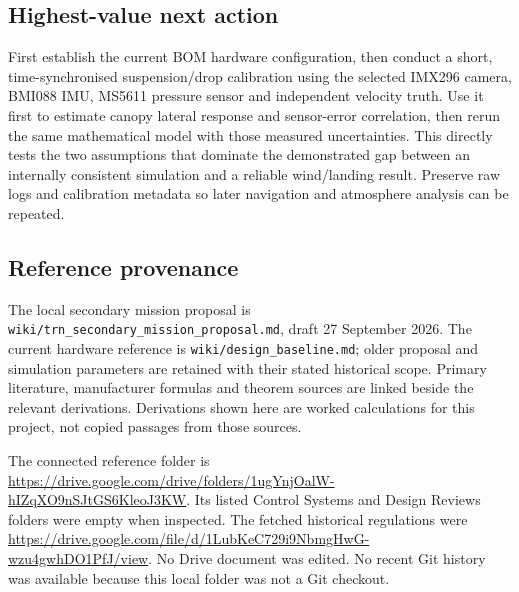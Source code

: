 \documentclass[11pt,a4paper]{article}
\numberwithin{equation}{section}
\begin{document}
\subsection{Highest-value next action}
First establish the current BOM hardware configuration, then conduct a short, time-synchronised suspension/drop calibration using the selected IMX296 camera, BMI088 IMU, MS5611 pressure sensor and independent velocity truth. Use it first to estimate canopy lateral response and sensor-error correlation, then rerun the same mathematical model with those measured uncertainties. This directly tests the two assumptions that dominate the demonstrated gap between an internally consistent simulation and a reliable wind/landing result. Preserve raw logs and calibration metadata so later navigation and atmosphere analysis can be repeated.

\subsection{Reference provenance}
The local secondary mission proposal is \texttt{wiki/trn\_secondary\_mission\_proposal.md}, draft 27 September 2026. The current hardware reference is \texttt{wiki/design\_baseline.md}; older proposal and simulation parameters are retained with their stated historical scope. Primary literature, manufacturer formulas and theorem sources are linked beside the relevant derivations. Derivations shown here are worked calculations for this project, not copied passages from those sources.

The connected reference folder is \url{https://drive.google.com/drive/folders/1ugYnjOalW-hIZqXO9nSJtGS6KleoJ3KW}. Its listed Control Systems and Design Reviews folders were empty when inspected. The fetched historical regulations were \url{https://drive.google.com/file/d/1LubKeC729i9NbmgHwG-wzu4gwhDO1PfJ/view}. No Drive document was edited. No recent Git history was available because this local folder was not a Git checkout.
\end{document}
